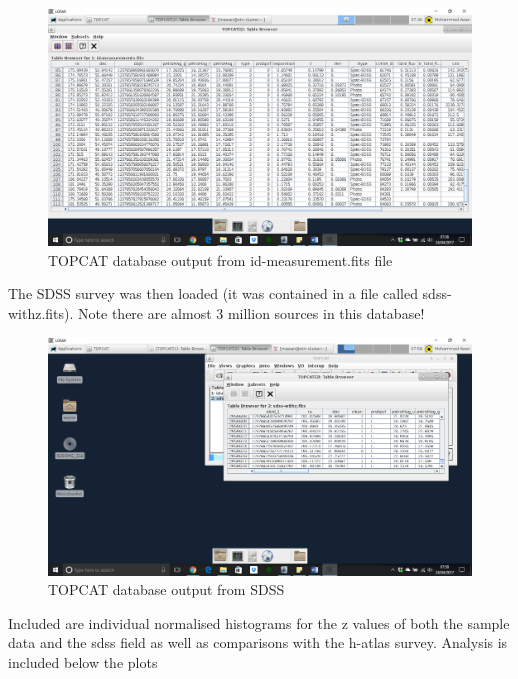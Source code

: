 \documentclass{article}
\begin{document}
\begin{figure}
    \centering
    \includegraphics[scale = 0.4]{idmeasure.png}
    \caption{TOPCAT database output from id-measurement.fits file }
\end{figure}

The SDSS survey was then loaded (it was contained in a file called sdss-withz.fits). Note there are almost 3 million sources in this database!

\begin{figure}
    \centering
    \includegraphics[scale = 0.4]{sdss.png}
    \caption{TOPCAT database output from SDSS}
\end{figure}

Included are individual normalised histograms for the z values of both the sample data and the sdss field as well as comparisons with the h-atlas survey. Analysis is included below the plots
\end{document}
